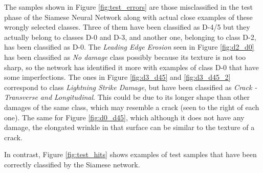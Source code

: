 The samples shown in Figure \ref{fig:test_errors} are those misclassified in the test phase of the Siamese Neural Network along with actual close examples of these wrongly selected classes. Three of them have been classified as D-4/5 but they actually belong to classes D-0 and D-3, and another one, belonging to class D-2, has been classified as D-0. The \emph{Leading Edge Erosion} seen in Figure \ref{fig:d2_d0} has been classified as \emph{No damage} class possibly because its texture is not too sharp, so the network has identified it more with examples of class D-0 that have some imperfections. The ones in Figure \ref{fig:d3_d45} and \ref{fig:d3_d45_2} correspond to class \emph{Lightning Strike Damage}, but have been classified as \emph{Crack - Transverse and Longitudinal}. This could be due to its longer shape than other damages of the same class, which may resemble a crack (seen to the right of each one). The same for Figure \ref{fig:d0_d45}, which although it does not have any damage, the elongated wrinkle in that surface can be similar to the texture of a crack.

In contrast, Figure \ref{fig:test_hits} shows examples of test samples that have been correctly classified by the Siamese network.

